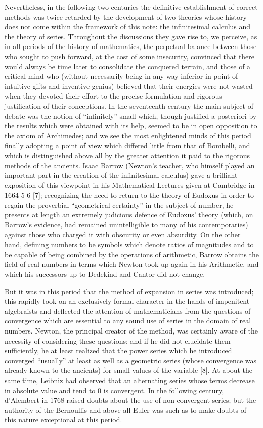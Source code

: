 Nevertheless, in the following two centuries the definitive establishment of correct methods was twice retarded by the development of two theories whose history does not come within the framework of this note: the infinitesimal calculus and the theory of series. Throughout the discussions they gave rise to, we perceive, as in all periods of the history of mathematics, the perpetual balance between those who sought to push forward, at the cost of some insecurity, convinced that there would always be time later to consolidate the conquered terrain, and those of a critical mind who (without necessarily being in any way inferior in point of intuitive gifts and inventive genius) believed that their energies were not wasted when they devoted their effort to the precise formulation and rigorous justification of their conceptions. In the seventeenth century the main subject of debate was the notion of ``infinitely'' small which, though justified a posteriori by the results which were obtained with its help, seemed to be in open opposition to the axiom of Archimedes; and we see the most enlightened minds of this period finally adopting a point of view which differed little from that of Bombelli, and which is distinguished above all by the greater attention it paid to the rigorous methods of the ancients. Isaac Barrow (Newton's teacher, who himself played an important part in the creation of the infinitesimal calculus) gave a brilliant exposition of this viewpoint in his Mathematical Lectures given at Cambridge in 1664-5-6 {[}7{]}; recognizing the need to return to the theory of Eudoxus in order to regain the proverbial ``geometrical certainty'' in the subject of number, he presents at length an extremely judicious defence of Eudoxus' theory (which, on Barrow's evidence, had remained unintelligible to many of his contemporaries) against those who charged it with obscurity or even absurdity. On the other hand, defining numbers to be symbols which denote ratios of magnitudes and to be capable of being combined by the operations of arithmetic, Barrow obtains the field of real numbers in terms which Newton took up again in his Arithmetic, and which his successors up to Dedekind and Cantor did not change.

But it was in this period that the method of expansion in series was introduced; this rapidly took on an exclusively formal character in the hands of impenitent algebraists and deflected the attention of mathematicians from the questions of convergence which are essential to any sound use of series in the domain of real numbers. Newton, the principal creator of the method, was certainly aware of the necessity of considering these questions; and if he did not elucidate them sufficiently, he at least realized that the power series which he introduced converged ``usually'' at least as well as a geometric series (whose convergence was already known to the ancients) for small values of the variable {[}8{]}. At about the same time, Leibniz had observed that an alternating series whose terms decrease in absolute value and tend to 0 is convergent. In the following century, d'Alembert in 1768 raised doubts about the use of non-convergent series; but the authority of the Bernoullis and above all Euler was such as to make doubts of this nature exceptional at this period.

